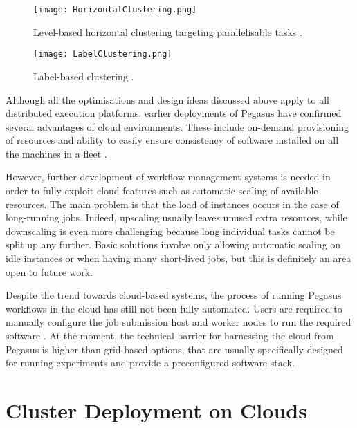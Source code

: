 \vspace{5mm}
\begin{figure}[H]
	\centering
		\texttt{[image: HorizontalClustering.png]}
	\caption{Level-based horizontal clustering targeting parallelisable tasks \cite{Deelman2013}.}
	\label{HorizontalClustering}
\end{figure}

\vspace{6mm}
\begin{figure}[H]
	\centering
		\texttt{[image: LabelClustering.png]}
	\caption{Label-based clustering \cite{Deelman2013}.}
	\label{LabelClustering}
\end{figure}

Although all the optimisations and design ideas discussed above apply to all distributed execution platforms, earlier deployments of Pegasus have confirmed several advantages of cloud environments. These include on-demand provisioning of resources and ability to easily ensure consistency of software installed on all the machines in a fleet \cite{Deelman2016}. 

However, further development of workflow management systems is needed in order to fully exploit cloud features such as automatic scaling of available resources. The main problem is that the load of instances occurs in the case of long-running jobs. Indeed, upscaling usually leaves unused extra resources, while downscaling is even more challenging because long individual tasks cannot be split up any further. Basic solutions involve only allowing automatic scaling on idle instances or when having many short-lived jobs, but this is definitely an area open to future work.

Despite the trend towards cloud-based systems, the process of running Pegasus workflows in the cloud has still not been fully automated. Users are required to manually configure the job submission host and worker nodes to run the required software \cite{PegasusTutorial}. At the moment, the technical barrier for harnessing the cloud from Pegasus is higher than grid-based options, that are usually specifically designed for running experiments and provide a preconfigured software stack.


\section{Cluster Deployment on Clouds}

